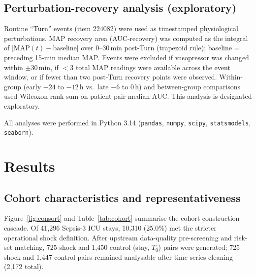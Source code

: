 \documentclass[referee,lineno,pdflatex]{sn-article-template/sn-jnl}
\begin{document}
\subsection{Perturbation-recovery analysis (exploratory)}
\label{sec:perturbation}

Routine ``Turn'' events (item 224082)
were used as timestamped physiological perturbations.
MAP recovery area (AUC-recovery) was computed as the integral of
$|\text{MAP}(t) - \text{baseline}|$ over 0--30\,min post-Turn (trapezoid rule);
baseline = preceding 15-min median MAP.
Events were excluded if vasopressor was changed within $\pm$30\,min,
if $<$3 total MAP readings were available across the event window,
or if fewer than two post-Turn recovery points were observed.
Within-group (early $-24$ to $-12$\,h vs.\ late $-6$ to $0$\,h) and
between-group comparisons used Wilcoxon rank-sum on patient-pair-median AUC.
This analysis is designated exploratory.

All analyses were performed in Python 3.14 (\texttt{pandas}, \texttt{numpy},
\texttt{scipy}, \texttt{statsmodels}, \texttt{seaborn}).

\section{Results}
\label{sec:results}

\subsection{Cohort characteristics and representativeness}
\label{sec:res-cohort}

Figure~\ref{fig:consort} and Table~\ref{tab:cohort} summarise the cohort construction cascade.
Of 41,296 Sepsis-3 ICU stays, 10,310 (25.0\%) met the stricter operational shock definition.
After upstream data-quality pre-screening and risk-set matching, 725 shock and 1,450 control
(stay, $T_0$) pairs were generated; 725 shock and 1,447 control pairs remained analysable after
time-series cleaning (2,172 total).
\end{document}
